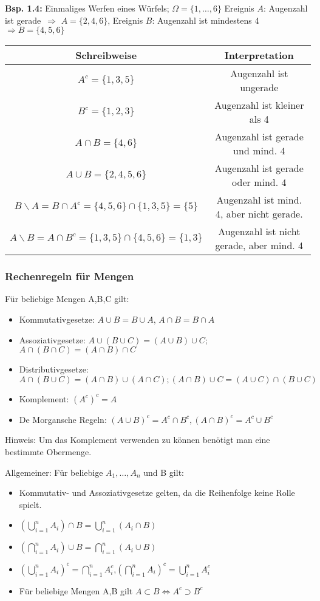\documentclass[a4paper,11pt]{article}
\begin{document}
\vspace{6pt}
\noindent\textbf{Bsp. 1.4:} Einmaliges Werfen eines Würfels; $\Omega = \{1,\dots,6\}$
\newline Ereignis $A$: \glqq Augenzahl ist gerade\grqq\ $\Rightarrow$ $A=\{2,4,6\}$, Ereignis $B$: \glqq Augenzahl ist mindestens 4\grqq\ $\Rightarrow B=\{4,5,6\}$
\newline\noindent\begin{tabular}{c|c}
Schreibweise & Interpretation\\
\hline
$A^c = \{1,3,5\}$ & Augenzahl ist ungerade\\
$B^c = \{1,2,3\}$ & Augenzahl ist kleiner als 4\\
$A\cap B = \{4,6\}$ & Augenzahl ist gerade und mind. 4\\
$A\cup B = \{2,4,5,6\}$ & Augenzahl ist gerade oder mind. 4\\
$B\backslash A = B\cap A^c = \{4,5,6\}\cap\{1,3,5\}=\{5\}$ & Augenzahl ist mind. 4, aber nicht gerade.\\
$A\backslash B = A\cap B^c = \{1,3,5\}\cap\{4,5,6\}=\{1,3\}$ & Augenzahl ist nicht gerade, aber mind. 4\\
\end{tabular}

\subsubsection{Rechenregeln für Mengen}
\noindent Für beliebige Mengen A,B,C gilt:
\begin{itemize}
    \item Kommutativgesetze: $A\cup B = B\cup A$, $A\cap B = B\cap A$
    \item Assoziativgesetze: $A\cup(B\cup C)=(A\cup B)\cup C$; $A\cap(B\cap C)=(A\cap B)\cap C$
    \item Distributivgesetze: $A\cap(B\cup C) = (A\cap B) \cup (A\cap C); (A\cap B)\cup C = (A\cup C)\cap (B\cup C)$
    \item Komplement: $(A^c)^c = A$
    \item De Morgansche Regeln: $(A\cup B)^c = A^c\cap B^c, (A\cap B)^c = A^c\cup B^c$
\end{itemize}
Hinweis: Um das Komplement verwenden zu können benötigt man eine bestimmte Obermenge.

\vspace{6pt}
\noindent Allgemeiner: Für beliebige $A_1,\dots,A_n$ und B gilt:
\begin{itemize}
    \item Kommutativ- und Assoziativgesetze gelten, da die Reihenfolge keine Rolle spielt.
    \item $(\bigcup_{i=1}^{n}A_i)\cap B = \bigcup_{i=1}^{n}(A_i\cap B)$
    \item $(\bigcap_{i=1}^{n}A_i)\cup B = \bigcap_{i=1}^{n}(A_i\cup B)$
    \item $(\bigcup_{i=1}^{n}A_i)^c = \bigcap_{i=1}^{n}A_i^c$,$(\bigcap_{i=1}^{n}A_i)^c = \bigcup_{i=1}^{n}A_i^c$
    \item Für beliebige Mengen A,B gilt $A\subset B \Leftrightarrow A^c\supset B^c$
\end{itemize}
\end{document}

